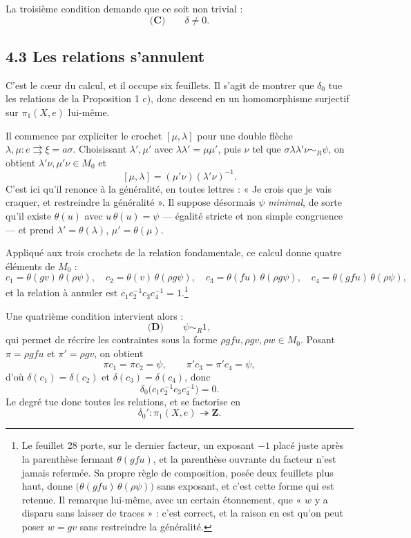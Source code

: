 \documentclass[11pt,a4paper]{article}
\begin{document}
La troisième condition demande que ce soit non trivial :
\[
  \textbf{(C)} \qquad \delta \neq 0 .
\]

\subsection*{4.3 Les relations s'annulent}

C'est le cœur du calcul, et il occupe six feuillets. Il s'agit de montrer
que $\delta_{0}$ tue les relations de la Proposition 1 c), donc descend en un
homomorphisme surjectif sur $\pi_{1}(X,e)$ lui-même.

Il commence par expliciter le crochet $[\mu,\lambda]$ pour une double flèche
$\lambda, \mu : e \rightrightarrows \xi = a\sigma$. Choisissant
$\lambda', \mu'$ avec $\lambda\lambda' = \mu\mu'$, puis $\nu$ tel que
$\sigma\lambda\lambda'\nu \sim_{R} \psi$, on obtient $\lambda'\nu, \mu'\nu \in M_{0}$
et
\[
  [\mu,\lambda] = (\mu'\nu)(\lambda'\nu)^{-1}.
\]
C'est ici qu'il renonce à la généralité, en toutes lettres : « Je crois que je
vais craquer, et restreindre la généralité ». Il suppose désormais $\psi$
\emph{minimal}, de sorte qu'il existe $\theta(u)$ avec $u\,\theta(u) = \psi$ —
égalité stricte et non simple congruence — et prend
$\lambda' = \theta(\lambda)$, $\mu' = \theta(\mu)$.

Appliqué aux trois crochets de la relation fondamentale, ce calcul donne
quatre éléments de $M_{0}$ :
\[
  c_{1} = \theta(gv)\,\theta(\rho\psi), \quad
  c_{2} = \theta(v)\,\theta(\rho g\psi), \quad
  c_{3} = \theta(fu)\,\theta(\rho g\psi), \quad
  c_{4} = \theta(gfu)\,\theta(\rho\psi),
\]
et la relation à annuler est $c_{1}c_{2}^{-1}c_{3}c_{4}^{-1} = 1$.\footnote{Le
feuillet 28 porte, sur le dernier facteur, un exposant $-1$ placé juste après
la parenthèse fermant $\theta(gfu)$, et la parenthèse ouvrante du facteur
n'est jamais refermée. Sa propre règle de composition, posée deux feuillets
plus haut, donne $\bigl(\theta(gfu)\,\theta(\rho\psi)\bigr)$ sans exposant, et
c'est cette forme qui est retenue. Il remarque lui-même, avec un certain
étonnement, que « $w$ y a disparu sans laisser de traces » : c'est correct, et
la raison en est qu'on peut poser $w = gv$ sans restreindre la généralité.}

Une quatrième condition intervient alors :
\[
  \textbf{(D)} \qquad \psi \sim_{R} 1 ,
\]
qui permet de récrire les contraintes sous la forme
$\rho g f u, \rho g v, \rho w \in M_{0}$. Posant
$\pi = \rho g f u$ et $\pi' = \rho g v$, on obtient
\[
  \pi c_{1} = \pi c_{2} = \psi, \qquad \pi' c_{3} = \pi' c_{4} = \psi,
\]
d'où $\delta(c_{1}) = \delta(c_{2})$ et $\delta(c_{3}) = \delta(c_{4})$, donc
\[
  \delta_{0}\bigl(c_{1}c_{2}^{-1}c_{3}c_{4}^{-1}\bigr) = 0 .
\]
Le degré tue donc toutes les relations, et se factorise en
\[
  \delta_{0}' : \pi_{1}(X,e) \twoheadrightarrow \mathbf{Z}.
\]
\end{document}
